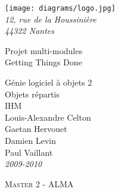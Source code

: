 \begin{titlepage}

\vspace*{2cm}



\begin{flushleft}
	\hspace{1cm} \texttt{[image: diagrams/logo.jpg]}\\
	\hspace{1cm} \textsl{12, rue de la Houssinière}\\
	\hspace{1cm} \textit{44322 Nantes}
	\hrulefill
\end{flushleft}




\vspace{2cm}

\begin{flushright}

	{\fontsize{1.4cm}{1.65cm}\selectfont 
Projet multi-modules} 	 \\
	{\fontsize{0.7cm}{0.825cm}\selectfont 
Getting Things Done} 	 \\

	
	\vspace{1cm}
	
	{\Large 
	Génie logiciel à objets 2\\  
	Objets répartis\\
	IHM
	}\\
	
	\vspace{1cm}
	Louis-Alexandre Celton \\
	Gaetan Hervouet \\
	Damien Levin \\
	Paul Vaillant \\
	\textit{2009-2010}
	
\end{flushright}


\vspace{2cm}

\begin{flushleft}



	\hspace{1cm} \textsc{Master 2 - ALMA}\\
	
\end{flushleft}

\hspace*{0,5cm}\hrulefill
\end{titlepage}
